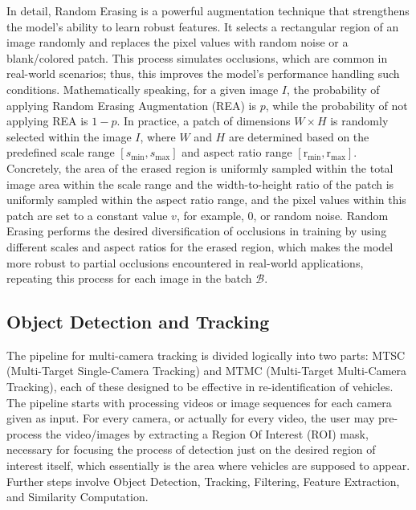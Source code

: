 In detail, Random Erasing is a powerful augmentation technique that strengthens the model's ability to learn robust features. It selects a rectangular region of an image randomly and replaces the pixel values with random noise or a blank/colored patch. This process simulates occlusions, which are common in real-world scenarios; thus, this improves the model's performance handling such conditions. Mathematically speaking, for a given image $I$, the probability of applying Random Erasing Augmentation (REA) is $p$, while the probability of not applying REA is $1-p$. In practice, a patch of dimensions $W \times H$ is randomly selected within the image $I$, where $W$ and $H$ are determined based on the predefined scale range $[s_{\text{min}}, s_{\text{max}}]$ and aspect ratio range $[\text{r}_{\text{min}}, \text{r}_{\text{max}}]$. Concretely, the area of the erased region is uniformly sampled within the total image area within the scale range and the width-to-height ratio of the patch is uniformly sampled within the aspect ratio range, and the pixel values within this patch are set to a constant value $v$, for example, 0, or random noise. Random Erasing performs the desired diversification of occlusions in training by using different scales and aspect ratios for the erased region, which makes the model more robust to partial occlusions encountered in real-world applications, repeating this process for each image in the batch $\mathcal{B}$.

\subsection{Object Detection and Tracking}
The pipeline for multi-camera tracking is divided logically into two parts: MTSC (Multi-Target Single-Camera Tracking) and MTMC (Multi-Target Multi-Camera Tracking), each of these designed to be effective in re-identification of vehicles. The pipeline starts with processing videos or image sequences for each camera given as input. For every camera, or actually for every video, the user may pre-process the video/images by extracting a Region Of Interest (ROI) mask, necessary for focusing the process of detection just on the desired region of interest itself, which essentially is the area where vehicles are supposed to appear. Further steps involve Object Detection, Tracking, Filtering, Feature Extraction, and Similarity Computation.

